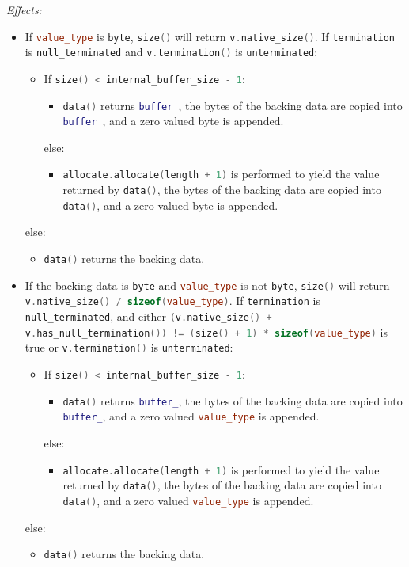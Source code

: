\documentclass[11pt]{article}
\newcommand{\code}[2][cpp]{\lstinline[language=#1,basicstyle=\small\ttfamily]{#2}}
\newcommand{\desc}[1]{\textit{#1}}
\newcommand{\effects}{\desc{Effects: }}
\begin{document}
\effects
\begin{itemize}
    \item If \code{value_type} is \code{byte}, \code{size()} will return \code{v.native_size()}. If \code{termination} is \code{null_terminated} and \code{v.termination()} is \code{unterminated}:
    \begin{itemize}
        \item If \code{size() < internal_buffer_size - 1}:
        \begin{itemize}
            \item \code{data()} returns \code{buffer_}, the bytes of the backing data are copied into \code{buffer_}, and a zero valued byte is appended. 
        \end{itemize}
        else:
        \begin{itemize}
            \item \code{allocate.allocate(length + 1)} is performed to yield the value returned by \code{data()}, the bytes of the backing data are copied into \code{data()}, and a zero valued byte is appended.
        \end{itemize}
    \end{itemize}
    else:
    \begin{itemize}
        \item \code{data()} returns the backing data.
    \end{itemize}
    
    \item If the backing data is \code{byte} and \code{value_type} is not \code{byte}, \code{size()} will return \code{v.native_size() / sizeof(value_type)}. If \code{termination} is \code{null_terminated}, and either \code{(v.native_size() + v.has_null_termination()) != (size() + 1) * sizeof(value_type)} is true or \code{v.termination()} is \code{unterminated}:
    \begin{itemize}
        \item If \code{size() < internal_buffer_size - 1}:
        \begin{itemize}
            \item \code{data()} returns \code{buffer_}, the bytes of the backing data are copied into \code{buffer_}, and a zero valued \code{value_type} is appended. 
        \end{itemize}
        else:
        \begin{itemize}
            \item \code{allocate.allocate(length + 1)} is performed to yield the value returned by \code{data()}, the bytes of the backing data are copied into \code{data()}, and a zero valued \code{value_type} is appended.
        \end{itemize}
    \end{itemize}
    else:
    \begin{itemize}
        \item \code{data()} returns the backing data.
    \end{itemize}


\end{itemize}
\end{document}
